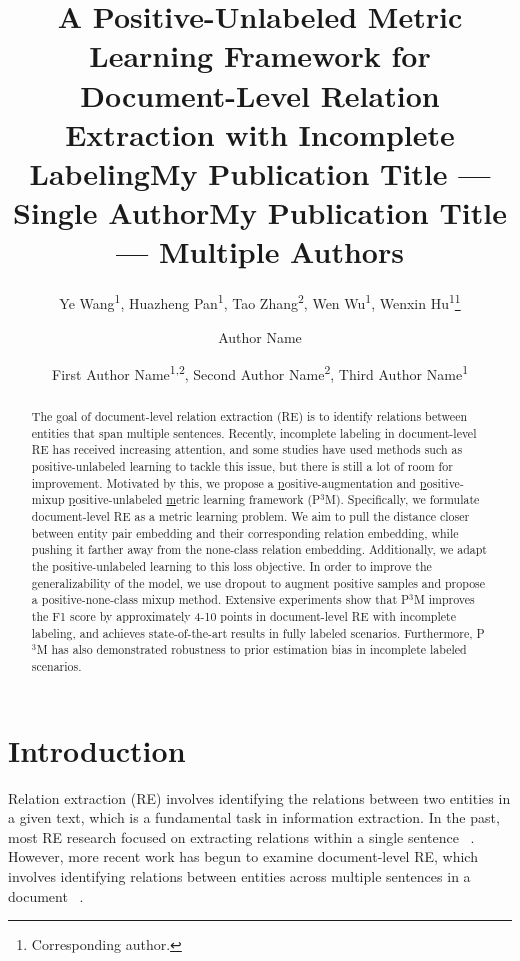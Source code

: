 \documentclass[letterpaper]{article} %
\title{A Positive-Unlabeled Metric Learning Framework for \\Document-Level Relation Extraction with Incomplete Labeling}
\author{
    Ye Wang\textsuperscript{\rm 1},
    Huazheng Pan\textsuperscript{\rm 1},
    Tao Zhang\textsuperscript{\rm 2},
    Wen Wu\textsuperscript{\rm 1},
    Wenxin Hu\textsuperscript{\rm 1}\thanks{Corresponding author.}
}
\title{My Publication Title --- Single Author}
\author {
    Author Name
}
\title{My Publication Title --- Multiple Authors}
\author {
    First Author Name\textsuperscript{\rm 1,\rm 2},
    Second Author Name\textsuperscript{\rm 2},
    Third Author Name\textsuperscript{\rm 1}
}
\begin{document}
\maketitle

\begin{abstract}
The goal of document-level relation extraction (RE) is to identify relations between entities that span multiple sentences. Recently, incomplete labeling in document-level RE has received increasing attention, and some studies have used methods such as positive-unlabeled learning to tackle this issue, but there is still a lot of room for improvement. Motivated by this, we propose a \underline{p}ositive-augmentation and \underline{p}ositive-mixup \underline{p}ositive-unlabeled \underline{m}etric learning framework (P$^{3}$M). Specifically, we formulate document-level RE as a metric learning problem. We aim to pull the distance closer between entity pair embedding and their corresponding relation embedding, while pushing it farther away from the none-class relation embedding. Additionally, we adapt the positive-unlabeled learning to this loss objective. In order to improve the generalizability of the model, we use dropout to augment positive samples and propose a positive-none-class mixup method. Extensive experiments show that P$^{3}$M improves the F1 score by approximately 4-10 points in document-level RE with incomplete labeling, and achieves state-of-the-art results in fully labeled scenarios. Furthermore, P$^{3}$M has also demonstrated robustness to prior estimation bias in incomplete labeled scenarios.
\end{abstract}

\section{Introduction}

Relation extraction (RE) involves identifying the relations between two entities in a given text, which is a fundamental task in information extraction. In the past, most RE research focused on extracting relations within a single sentence ~\cite{DBLP:conf/acl/MiwaB16, DBLP:conf/emnlp/Zhang0M18}. However, more recent work has begun to examine document-level RE, which involves identifying relations between entities across multiple sentences in a document ~\cite{DBLP:conf/acl/YaoYLHLLLHZS19, DBLP:conf/aaai/Zhou0M021, DBLP:conf/naacl/XuCMZ22,DBLP:conf/naacl/YuYT22,DBLP:conf/ijcai/ZhouL22}.
\end{document}
